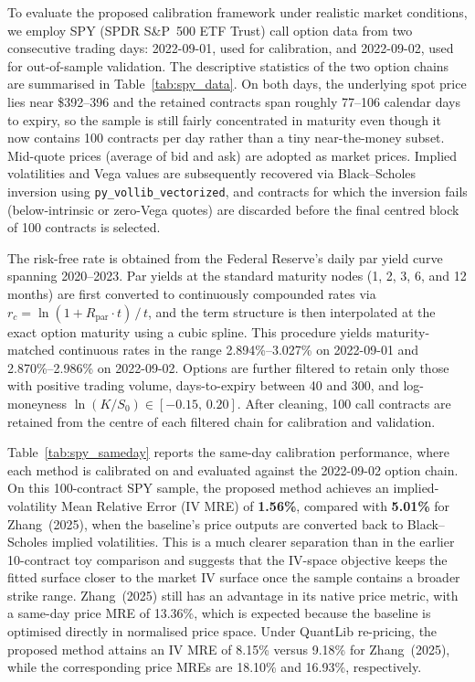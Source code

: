 
To evaluate the proposed calibration framework under realistic market conditions, we employ SPY (SPDR S\&P~500 ETF Trust) call option data from two consecutive trading days: 2022-09-01, used for calibration, and 2022-09-02, used for out-of-sample validation. The descriptive statistics of the two option chains are summarised in Table~\ref{tab:spy_data}. On both days, the underlying spot price lies near \$392--396 and the retained contracts span roughly 77--106 calendar days to expiry, so the sample is still fairly concentrated in maturity even though it now contains 100 contracts per day rather than a tiny near-the-money subset. Mid-quote prices (average of bid and ask) are adopted as market prices. Implied volatilities and Vega values are subsequently recovered via Black--Scholes inversion using \texttt{py\_vollib\_vectorized}, and contracts for which the inversion fails (below-intrinsic or zero-Vega quotes) are discarded before the final centred block of 100 contracts is selected.

The risk-free rate is obtained from the Federal Reserve's daily par yield curve spanning 2020--2023. Par yields at the standard maturity nodes (1, 2, 3, 6, and 12 months) are first converted to continuously compounded rates via $r_c = \ln(1 + R_{\text{par}} \cdot t)\,/\,t$, and the term structure is then interpolated at the exact option maturity using a cubic spline. This procedure yields maturity-matched continuous rates in the range 2.894\%--3.027\% on 2022-09-01 and 2.870\%--2.986\% on 2022-09-02. Options are further filtered to retain only those with positive trading volume, days-to-expiry between 40 and 300, and log-moneyness $\ln(K/S_0) \in [-0.15,\, 0.20]$. After cleaning, 100 call contracts are retained from the centre of each filtered chain for calibration and validation.

Table~\ref{tab:spy_sameday} reports the same-day calibration performance, where each method is calibrated on and evaluated against the 2022-09-02 option chain. On this 100-contract SPY sample, the proposed method achieves an implied-volatility Mean Relative Error (IV MRE) of \textbf{1.56\%}, compared with \textbf{5.01\%} for Zhang~(2025), when the baseline's price outputs are converted back to Black--Scholes implied volatilities. This is a much clearer separation than in the earlier 10-contract toy comparison and suggests that the IV-space objective keeps the fitted surface closer to the market IV surface once the sample contains a broader strike range. Zhang~(2025) still has an advantage in its native price metric, with a same-day price MRE of 13.36\%, which is expected because the baseline is optimised directly in normalised price space. Under QuantLib re-pricing, the proposed method attains an IV MRE of 8.15\% versus 9.18\% for Zhang~(2025), while the corresponding price MREs are 18.10\% and 16.93\%, respectively.


